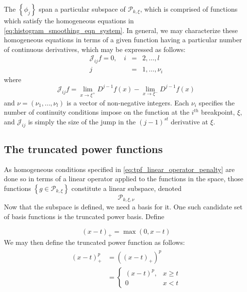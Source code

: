 \documentclass[12pt]{article}
\newcommand{\PP}{\mathcal{P}}
\theoremstyle{definition}
\begin{document}
\noindent
The $\left\{ \phi_j \right\}$ span a particular subspace of $\mathcal{P}_{k, \xi}$, which is comprised of functions which satisfy the homogeneous equations in \ref{eq:histogram_smoothing_eqn_system}. In general, we may characterize these homogeneous equations in terms of a given function having a particular number of continuous derivatives, which may be expressed as follows:
\begin{eqnarray}
\mathscr{J}_{ij}f = 0, \quad  i&=&2,\dots,l \label{eq:tpf_linear_operator_penalty} \\
 j&=&1,\dots,\nu_i \nonumber
\end{eqnarray}
\noindent
where
\begin{equation}
\mathscr{J}_{ij}f = \lim_{x\rightarrow \xi^+} D^{j-1}f\left(x\right) - \lim_{x\rightarrow \xi^-} D^{j-1}f\left(x\right)
\end{equation}
\noindent
and $\nu = \left(\nu_1,\dots, \nu_l\right)$ is a vector of non-negative integers. Each $\nu_i$ specifies the number of continuity conditions impose on the function at the $i^{th}$ breakpoint, $\xi$, and $\mathscr{J}_{ij}$ is simply the size of the jump in the $\left(j-1\right)^{st}$ derivative at $\xi$.


\subsection{The truncated power functions}
As homogeneous conditions specified in \ref{eq:tpf_linear_operator_penalty} are done so in terms of a linear operator applied to the functions in the space, those functions $\left\{ g \in \PP_{k,\xi} \right\}$ constitute a linear subspace, denoted
\[
 \PP_{k,\xi, \nu} 
\]
\noindent
Now that the subspace is defined, we need a basis for it. One such candidate set of basis functions is the truncated power basis. Define

\[
\left(x-t\right)_+ = \max\left(0,x-t\right)
\]
\noindent
We may then define the truncated power function as follows:
\begin{align}
\begin{split}
\left(x-t\right)_+^p &= \left( \left(x-t\right)_+\right)^p\\
&= \left\{\begin{array}{lr}
	\left(x-t\right)^p, & x \ge t\\
	0 & x < t
	\end{array} \right.
	\end{split}
\end{align}
\end{document}
